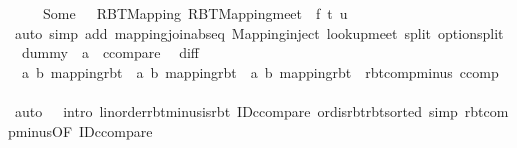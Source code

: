 \begin{isabellebody}
\ \ \ \ {\isacharbar}{\kern0pt}\ Some\ {\isacharunderscore}{\kern0pt}\ {\isasymRightarrow}\ RBT{\isacharunderscore}{\kern0pt}Mapping\ {\isacharparenleft}{\kern0pt}RBT{\isacharunderscore}{\kern0pt}Mapping{}{\isachardot}{\kern0pt}meet\ {\isacharparenleft}{\kern0pt}{\isasymlambda}{\isacharunderscore}{\kern0pt}{\isachardot}{\kern0pt}\ f{\isacharparenright}{\kern0pt}\ t\ u{\isacharparenright}{\kern0pt}{\isacharparenright}{\kern0pt}{\isachardoublequoteclose}\isanewline
%
\isadelimproof
\ \ %
\endisadelimproof
%
\isatagproof
{}\isamarkupfalse%
\ {\isacharparenleft}{\kern0pt}auto\ simp\ add{\isacharcolon}{\kern0pt}\ mapping{\isacharunderscore}{\kern0pt}join{\isachardot}{\kern0pt}abs{\isacharunderscore}{\kern0pt}eq\ Mapping{\isacharunderscore}{\kern0pt}inject\ lookup{\isacharunderscore}{\kern0pt}meet\ split{\isacharcolon}{\kern0pt}\ option{\isachardot}{\kern0pt}split{\isacharparenright}{\kern0pt}%
\endisatagproof
{\isafoldproof}%
%
\isadelimproof
\isanewline
%
\endisadelimproof
\isanewline
{}\isamarkupfalse%
\ \ dummy\ {\isacharcolon}{\kern0pt}{\isacharcolon}{\kern0pt}\ {\isachardoublequoteopen}{\isacharprime}{\kern0pt}a\ {\isacharcolon}{\kern0pt}{\isacharcolon}{\kern0pt}\ ccompare{\isachardoublequoteclose}\ \isanewline
\isanewline
{}\isamarkupfalse%
\ diff\ {\isacharcolon}{\kern0pt}{\isacharcolon}{\kern0pt}\isanewline
\ \ {\isachardoublequoteopen}{\isacharparenleft}{\kern0pt}{\isacharprime}{\kern0pt}a{\isacharcomma}{\kern0pt}\ {\isacharprime}{\kern0pt}b{\isacharparenright}{\kern0pt}\ mapping{\isacharunderscore}{\kern0pt}rbt\ {\isasymRightarrow}\ {\isacharparenleft}{\kern0pt}{\isacharprime}{\kern0pt}a{\isacharcomma}{\kern0pt}\ {\isacharprime}{\kern0pt}b{\isacharparenright}{\kern0pt}\ mapping{\isacharunderscore}{\kern0pt}rbt\ {\isasymRightarrow}\ {\isacharparenleft}{\kern0pt}{\isacharprime}{\kern0pt}a{\isacharcomma}{\kern0pt}\ {\isacharprime}{\kern0pt}b{\isacharparenright}{\kern0pt}\ mapping{\isacharunderscore}{\kern0pt}rbt{\isachardoublequoteclose}\ \ {\isachardoublequoteopen}rbt{\isacharunderscore}{\kern0pt}comp{\isacharunderscore}{\kern0pt}minus\ ccomp{\isachardoublequoteclose}\isanewline
%
\isadelimproof
\ \ %
\endisadelimproof
%
\isatagproof
{}\isamarkupfalse%
\ {\isacharparenleft}{\kern0pt}auto\ {}\ {}\ intro{\isacharcolon}{\kern0pt}\ linorder{\isachardot}{\kern0pt}rbt{\isacharunderscore}{\kern0pt}minus{\isacharunderscore}{\kern0pt}is{\isacharunderscore}{\kern0pt}rbt\ ID{\isacharunderscore}{\kern0pt}ccompare\ ord{\isachardot}{\kern0pt}is{\isacharunderscore}{\kern0pt}rbt{\isacharunderscore}{\kern0pt}rbt{\isacharunderscore}{\kern0pt}sorted\ simp{\isacharcolon}{\kern0pt}\ rbt{\isacharunderscore}{\kern0pt}comp{\isacharunderscore}{\kern0pt}minus{\isacharbrackleft}{\kern0pt}OF\ ID{\isacharunderscore}{\kern0pt}ccompare{\isacharprime}{\kern0pt}{\isacharbrackright}{\kern0pt}{\isacharparenright}{\kern0pt}%

\end{isabellebody}
